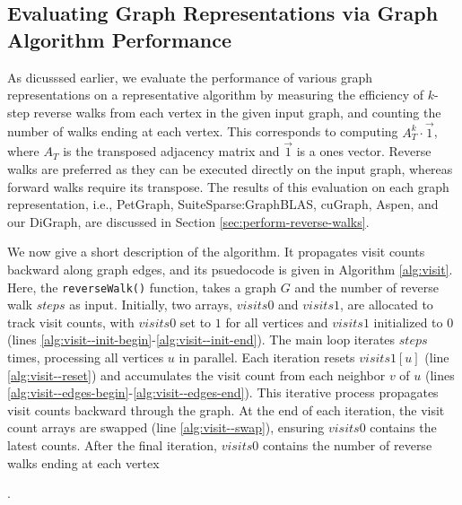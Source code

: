 \subsection{Evaluating Graph Representations via Graph Algorithm Performance}

As dicusssed earlier, we evaluate the performance of various graph representations on a representative algorithm by measuring the efficiency of $k$-step reverse walks from each vertex in the given input graph, and counting the number of walks ending at each vertex. This corresponds to computing $A_T^k \cdot \vec{1}$, where $A_T$ is the transposed adjacency matrix and $\vec{1}$ is a ones vector. Reverse walks are preferred as they can be executed directly on the input graph, whereas forward walks require its transpose. The results of this evaluation on each graph representation, i.e., PetGraph, SuiteSparse:GraphBLAS, cuGraph, Aspen, and our DiGraph, are discussed in Section \ref{sec:perform-reverse-walks}.

We now give a short description of the algorithm. It propagates visit counts backward along graph edges, and its psuedocode is given in Algorithm \ref{alg:visit}. Here, the \texttt{reverseWalk()} function, takes a graph $G$ and the number of reverse walk $steps$ as input. Initially, two arrays, $visits0$ and $visits1$, are allocated to track visit counts, with $visits0$ set to $1$ for all vertices and $visits1$ initialized to $0$ (lines \ref{alg:visit--init-begin}-\ref{alg:visit--init-end}). The main loop iterates $steps$ times, processing all vertices $u$ in parallel. Each iteration resets $visits1[u]$ (line \ref{alg:visit--reset}) and accumulates the visit count from each neighbor $v$ of $u$ (lines \ref{alg:visit--edges-begin}-\ref{alg:visit--edges-end}). This iterative process propagates visit counts backward through the graph. At the end of each iteration, the visit count arrays are swapped (line \ref{alg:visit--swap}), ensuring $visits0$ contains the latest counts. After the final iteration, $visits0$ contains the number of reverse walks ending at each vertex.



